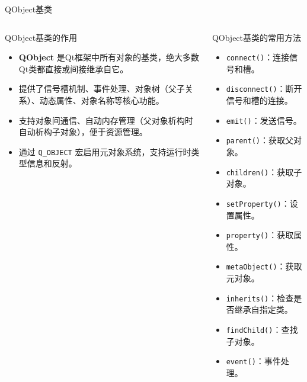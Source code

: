 \documentclass[UTF8,aspectratio=169]{beamer}
\begin{document}
\begin{frame}[fragile]{QObject基类}
    \begin{columns}
        \begin{column}{0.48\textwidth}
            \begin{ytublock}{QObject基类的作用}
                \begin{itemize}
                    \item \textbf{QObject} 是Qt框架中所有对象的基类，绝大多数Qt类都直接或间接继承自它。
                    \item 提供了信号槽机制、事件处理、对象树（父子关系）、动态属性、对象名称等核心功能。
                    \item 支持对象间通信、自动内存管理（父对象析构时自动析构子对象），便于资源管理。
                    \item 通过 \texttt{Q\_OBJECT} 宏启用元对象系统，支持运行时类型信息和反射。
                \end{itemize}
            \end{ytublock}
        \end{column}
        \begin{column}{0.48\textwidth}
            \begin{ytublock}{QObject基类的常用方法}
                \begin{itemize}
                    \item \texttt{connect()}：连接信号和槽。
                    \item \texttt{disconnect()}：断开信号和槽的连接。
                    \item \texttt{emit()}：发送信号。
                    \item \texttt{parent()}：获取父对象。
                    \item \texttt{children()}：获取子对象。
                    \item \texttt{setProperty()}：设置属性。
                    \item \texttt{property()}：获取属性。
                    \item \texttt{metaObject()}：获取元对象。
                    \item \texttt{inherits()}：检查是否继承自指定类。
                    \item \texttt{findChild()}：查找子对象。
                    \item \texttt{event()}：事件处理。
                \end{itemize}
            \end{ytublock}
        \end{column}
    \end{columns}
\end{frame}
\end{document}
